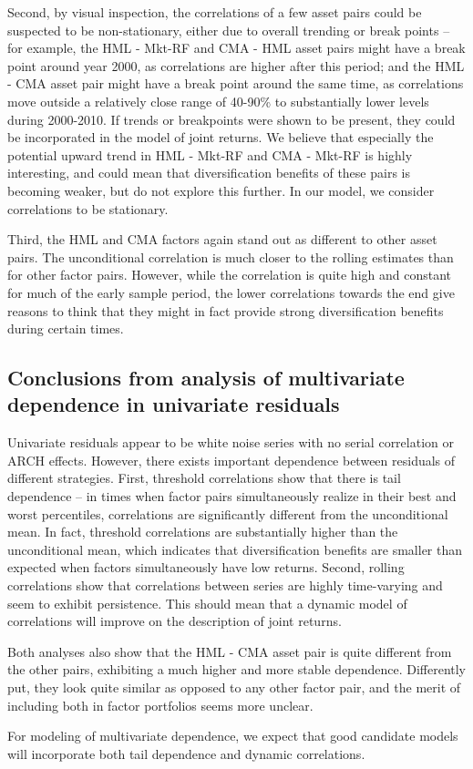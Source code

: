 Second, by visual inspection, the correlations of a few asset pairs could be suspected to be non-stationary, either due to overall trending or break points -- for example, the HML - Mkt-RF and CMA - HML asset pairs might have a break point around year 2000, as correlations are higher after this period; and the HML - CMA asset pair might have a break point around the same time, as correlations move outside a relatively close range of 40-90\% to substantially lower levels during 2000-2010. If trends or breakpoints were shown to be present, they could be incorporated in the model of joint returns. We believe that especially the potential upward trend in HML - Mkt-RF and CMA - Mkt-RF is highly interesting, and could mean that diversification benefits of these pairs is becoming weaker, but do not explore this further. In our model, we consider correlations to be stationary.

Third, the HML and CMA factors again stand out as different to other asset pairs. The unconditional correlation is much closer to the rolling estimates than for other factor pairs. However, while the correlation is quite high and constant for much of the early sample period, the lower correlations towards the end give reasons to think that they might in fact provide strong diversification benefits during certain times.

\subsection{Conclusions from analysis of multivariate dependence in univariate residuals}
Univariate residuals appear to be white noise series with no serial correlation or ARCH effects. However, there exists important dependence between residuals of different strategies. First, threshold correlations show that there is tail dependence -- in times when factor pairs simultaneously realize in their best and worst percentiles, correlations are significantly different from the unconditional mean. In fact, threshold correlations are substantially higher than the unconditional mean, which indicates that diversification benefits are smaller than expected when factors simultaneously have low returns. Second, rolling correlations show that correlations between series are highly time-varying and seem to exhibit persistence. This should mean that a dynamic model of correlations will improve on the description of joint returns.

Both analyses also show that the HML - CMA asset pair is quite different from the other pairs, exhibiting a much higher and more stable dependence. Differently put, they look quite similar as opposed to any other factor pair, and the merit of including both in factor portfolios seems more unclear.

For modeling of multivariate dependence, we expect that good candidate models will incorporate both tail dependence and dynamic correlations.